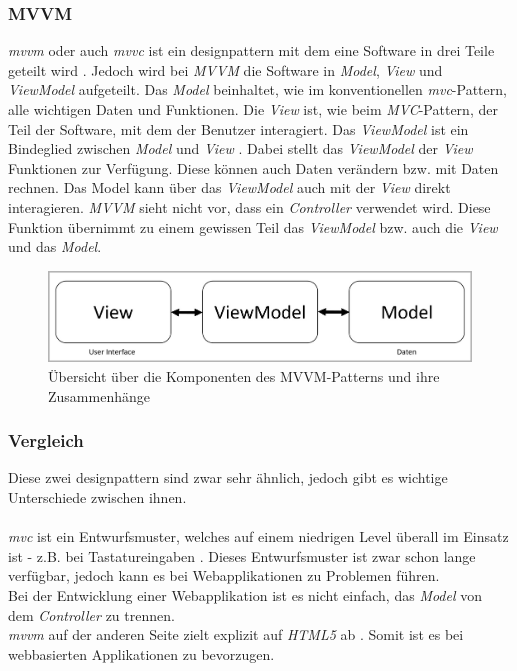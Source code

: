 \subsubsection{MVVM}
\textit{\Gls{mvvm}} oder auch \textit{\Gls{mvvc}} ist ein \Gls{designpattern} mit dem eine Software in drei Teile geteilt wird \cite{mvvm_vue}. Jedoch wird bei \textit{MVVM} die Software in \textit{Model}, \textit{View} und \textit{ViewModel} aufgeteilt. 
Das \textit{Model} beinhaltet, wie im konventionellen \textit{\Gls{mvc}}-Pattern, alle wichtigen Daten und Funktionen. 
Die \textit{View} ist, wie beim \textit{MVC}-Pattern, der Teil der Software, mit dem der Benutzer interagiert. 
Das \textit{ViewModel} ist ein Bindeglied zwischen \textit{Model} und \textit{View} \cite{mvvm_vue}. Dabei stellt das \textit{ViewModel} der \textit{View} Funktionen zur Verfügung. Diese können auch Daten verändern bzw. mit Daten rechnen. Das Model kann über das \textit{ViewModel} auch mit der \textit{View} direkt interagieren. 
\textit{MVVM} sieht nicht vor, dass ein \textit{Controller} verwendet wird. Diese Funktion übernimmt zu einem gewissen Teil das \textit{ViewModel} bzw. auch die \textit{View} und das \textit{Model}.
\begin{figure}[H]
	\centering
	\includegraphics[width=0.8\linewidth]{images/rfoster_study/mvvm}
	\caption[Übersicht des MVVM-Patterns]{Übersicht über die Komponenten des MVVM-Patterns und ihre Zusammenhänge}
	\label{fig:mvvm}
\end{figure}
\subsubsection{Vergleich}
Diese zwei \Gls{designpattern} sind zwar sehr ähnlich, jedoch gibt es wichtige Unterschiede zwischen ihnen.\\\\
\textit{\Gls{mvc}} ist ein Entwurfsmuster, welches auf einem niedrigen Level überall im Einsatz ist - z.B. bei Tastatureingaben \cite{mvc}. Dieses Entwurfsmuster ist zwar schon lange verfügbar, jedoch kann es bei Webapplikationen zu Problemen führen.\\
Bei der Entwicklung einer Webapplikation ist es nicht einfach, das \textit{Model} von dem \textit{Controller} zu trennen.\\
\textit{\Gls{mvvm}} auf der anderen Seite zielt explizit auf \textit{HTML5} ab \cite{mvvm_vue}. Somit ist es bei webbasierten Applikationen zu bevorzugen.
\newpage
